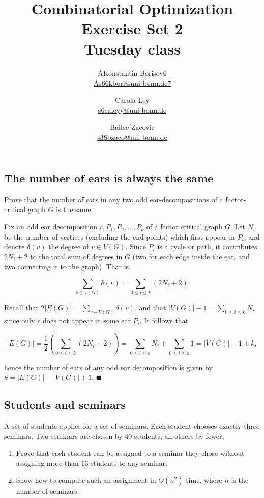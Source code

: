 \documentclass{article}
\title{Combinatorial Optimization \\ Exercise Set 2 \\ Tuesday class}
\author{
  \AA{Konstantin Borisov}{6} \\
  \href{mailto:\AA{s66kbori@uni-bonn.de}{7}}{\AA{s66kbori@uni-bonn.de}{7}}
  \and
  Carola Ley \\
  \href{mailto:s6caleyy@uni-bonn.de}{s6caleyy@uni-bonn.de}
  \and
  Bailee Zacovic \\
  \href{mailto:s38bzaco@uni-bonn.de}{s38bzaco@uni-bonn.de}
}
\begin{document}
  \maketitle

  \setcounter{section}{2}
  \subsection{The number of ears is always the same}
  \begin{centerframebox}
    Prove that the number of ears in any two odd ear-decompositions of a factor-critical graph $G$ is the same.
  \end{centerframebox}

Fix an odd ear decomposition $r, P_1, P_2, \dots, P_k$ of a factor critical graph $G.$ Let $N_i$ be the number of vertices (excluding the end points) which first appear in $P_i$, and denote $\delta(v)$ the degree of $v\in V(G)$. Since $P_i$ is a cycle or path, it contributes $2N_i+2$ to the total sum of degrees in $G$ (two for each edge inside the ear, and two connecting it to the graph). That is,

$$\sum_{v\in V(G)} \delta(v)=\sum_{0\leq i\leq k} (2N_i+2).$$

Recall that $2|E(G)|=\sum_{v\in V(G)} \delta(v)$, and that $|V(G)|-1=\sum_{0\leq i\leq k} N_i $ since only $r$ does not appear in some ear $P_i$. It follows that

$$|E(G)|=\frac{1}{2}\left(\sum_{0\leq i\leq k} (2N_i+2)\right)=\sum_{0\leq i\leq k} N_i+\sum_{0\leq i\leq k}1=|V(G)|-1+k,$$

hence the number of ears of any odd ear decomposition is given by $k=|E(G)|-|V(G)|+1.$ $\blacksquare$

  \subsection{Students and seminars}
  \begin{centerframebox}
    A set of students applies for a set of seminars. Each student chooses
    exactly three seminars. Two seminars are chosen by $40$ students, all others by
    fewer.

    \begin{enumerate}[label=(\alph*)]
      \item
      Prove that each student can be assigned to a seminar they chose without
      assigning more than $13$ students to any seminar.

      \item
      Show how to compute such an assignment in $O(n^2)$ time, where $n$ is the number of seminars.
    \end{enumerate}

  \end{centerframebox}
\end{document}
